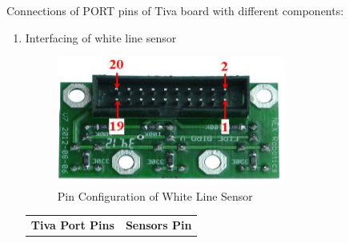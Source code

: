 \documentclass[a4paper,12pt,oneside]{book}
\begin{document}
Connections of PORT pins of Tiva board with different components:\\
\begin {enumerate}
\item Interfacing of white line sensor
\begin{center}
	\begin{figure}[h]
		\centering
		\includegraphics[scale=1]{whiteline_pin}
		\caption{Pin Configuration of White Line Sensor}
	\end{figure}

 \begin{tabular}{| c | c |}
 
 	\hline
 	\textbf{Tiva Port Pins} & \textbf{Sensors Pin}\\
 

\end{tabular}
\end{center}
\end{enumerate}
\end{document}
